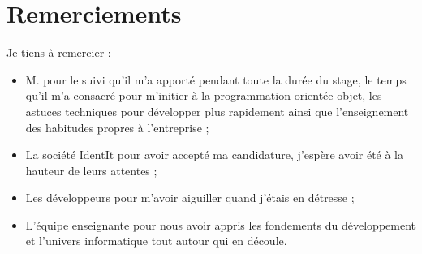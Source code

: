 \chapter*{Remerciements} %
\label{cha:Remerciements}

Je tiens à remercier :
\begin{itemize}
\item M. pour le suivi qu'il m'a apporté pendant toute la durée du
stage, le temps qu'il m'a consacré pour m'initier à la programmation orientée
objet, les astuces techniques pour développer plus rapidement ainsi que
l'enseignement des habitudes propres à l'entreprise ;
\item La société IdentIt pour avoir accepté ma candidature, j'espère avoir
été à la hauteur de leurs attentes ;
\item Les développeurs pour m'avoir aiguiller quand j'étais en détresse ;
\item L'équipe enseignante pour nous avoir appris les fondements du
développement et l'univers informatique tout autour qui en découle.
\end{itemize}
